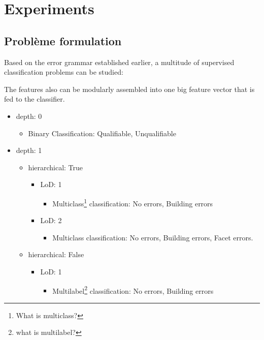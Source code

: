 \documentclass[../main.tex]{subfile}
\begin{document}
    \section{Experiments}

    \subsection{Problème formulation}

    Based on the error grammar established earlier, a multitude of supervised classification problems can be studied:


    The features also can be modularly assembled into one big feature vector that is fed to the classifier.

    \begin{itemize}
        \item depth: 0
        \begin{itemize}
            \item Binary Classification: Qualifiable, Unqualifiable
        \end{itemize}
        \item depth: 1
        \begin{itemize}
            \item hierarchical: True
            \begin{itemize}
                \item LoD\@: 1
                \begin{itemize}
                    \item Multiclass\footnote{What is multiclass?} classification: No errors, Building errors
                \end{itemize}
                \item LoD\@: 2
                \begin{itemize}
                    \item Multiclass classification: No errors, Building errors, Facet errors.
                \end{itemize}
            \end{itemize}
            \item hierarchical: False
            \begin{itemize}
                \item LoD\@: 1
                \begin{itemize}
                    \item Multilabel\footnote{what is multilabel?} classification: No errors, Building errors

\end{itemize}
\end{itemize}
\end{itemize}
\end{itemize}
\end{document}
